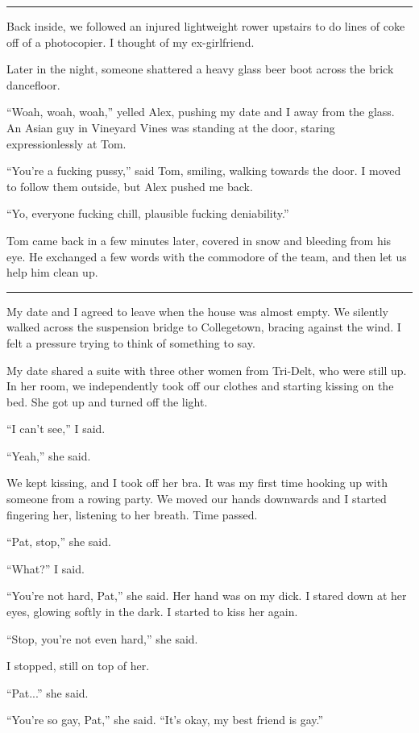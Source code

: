 \plainfancybreak{12pt}{2}{}

Back inside, we followed an injured lightweight rower upstairs to do lines of
coke off of a photocopier.  I thought of my ex-girlfriend.

Later in the night, someone shattered a heavy glass beer boot across the brick
dancefloor.  

``Woah, woah, woah,'' yelled Alex, pushing my date and I away from the glass.
An Asian guy in Vineyard Vines was standing at the door, staring
expressionlessly at Tom.

``You're a fucking pussy,'' said Tom, smiling, walking towards the door.  I
moved to follow them outside, but Alex pushed me back.

``Yo, everyone fucking chill, plausible fucking deniability.''

Tom came back in a few minutes later, covered in snow and bleeding from his eye.
He exchanged a few words with the commodore of the team, and then let us help
him clean up.

\plainfancybreak{12pt}{2}{}

My date and I agreed to leave when the house was almost empty.  We silently
walked across the suspension bridge to Collegetown, bracing against the wind.  I
felt a pressure trying to think of something to say.

My date shared a suite with three other women from Tri-Delt, who were still up.
In her room, we independently took off our clothes and starting kissing on the
bed.  She got up and turned off the light.

``I can't see,'' I said.  

``Yeah,'' she said.

We kept kissing, and I took off her bra.  It was my first time hooking up with
someone from a rowing party.  We moved our hands downwards and I started
fingering her, listening to her breath.  Time passed.

``Pat, stop,'' she said.

``What?'' I said.

``You're not hard, Pat,'' she said.  Her hand was on my dick.  I stared down at
her eyes, glowing softly in the dark.  I started to kiss her again.

``Stop, you're not even hard,'' she said.

I stopped, still on top of her.

``Pat...'' she said.

``You're so gay, Pat,'' she said.  ``It's okay, my best friend is gay.''

